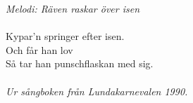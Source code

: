 {\footnotesize\textit{Melodi: Räven raskar över isen}}\\
\\
\revrpt Kypar'n springer efter isen.\rpt\\
\revrpt Och får han lov\rpt\\
Så tar han punschflaskan med sig.\\
\\
{\footnotesize\textit{Ur sångboken från Lundakarnevalen 1990.}}
